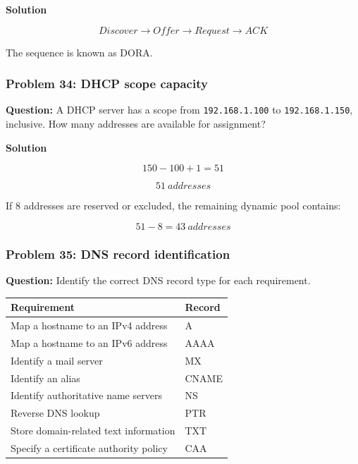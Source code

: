 \textbf{Solution}



\[
\boxed{Discover\rightarrow Offer\rightarrow Request\rightarrow ACK}
\]



The sequence is known as DORA.

\subsubsection*{Problem 34: DHCP scope capacity}

\textbf{Question:} A DHCP server has a scope from \texttt{192.168.1.100} to \texttt{192.168.1.150}, inclusive. How many addresses are available for assignment?

\textbf{Solution}



\[
150-100+1=51
\]





\[
\boxed{51\ addresses}
\]



If 8 addresses are reserved or excluded, the remaining dynamic pool contains:



\[
51-8=\boxed{43\ addresses}
\]



\subsubsection*{Problem 35: DNS record identification}

\textbf{Question:} Identify the correct DNS record type for each requirement.

\begin{center}
\begin{tabularx}{\linewidth}{p{5.5cm} X}
\toprule
\textbf{Requirement} & \textbf{Record} \\
\midrule
Map a hostname to an IPv4 address & A \\
Map a hostname to an IPv6 address & AAAA \\
Identify a mail server & MX \\
Identify an alias & CNAME \\
Identify authoritative name servers & NS \\
Reverse DNS lookup & PTR \\
Store domain-related text information & TXT \\
Specify a certificate authority policy & CAA \\
\bottomrule
\end{tabularx}
\end{center}

